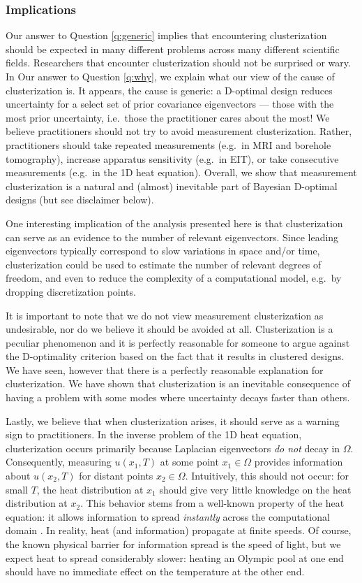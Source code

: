 \documentclass[ba]{imsart}
\theoremstyle{plain}
\theoremstyle{definition}
\theoremstyle{remark}
\begin{document}
\subsubsection{Implications}
Our answer to Question \ref{q:generic} implies that encountering
clusterization should be expected in many different problems across
many different scientific fields. Researchers that encounter
clusterization should not be surprised or wary. In Our answer to
Question \ref{q:why}, we explain what our view of the cause of
clusterization is. It appears, the cause is generic: a D-optimal
design reduces uncertainty for a select set of prior covariance
eigenvectors --- those with the most prior uncertainty, i.e.~those the
practitioner cares about the most! We believe practitioners should not
try to avoid measurement clusterization. Rather, practitioners should
take repeated measurements (e.g.~in MRI and borehole tomography),
increase apparatus sensitivity (e.g.~in EIT), or take consecutive
measurements (e.g.~in the 1D heat equation). Overall, we show that
measurement clusterization is a natural and (almost) inevitable part
of Bayesian D-optimal designs (but see disclaimer below).

One interesting implication of the analysis presented here is that
clusterization can serve as an evidence to the number of relevant
eigenvectors. Since leading eigenvectors typically correspond to slow
variations in space and/or time, clusterization could be used to
estimate the number of relevant degrees of freedom, and even to reduce
the complexity of a computational model, e.g.~by dropping
discretization points.

It is important to note that we do not view measurement clusterization
as undesirable, nor do we believe it should be avoided at
all. Clusterization is a peculiar phenomenon and it is perfectly
reasonable for someone to argue against the D-optimality criterion
based on the fact that it results in clustered designs. We have seen,
however that there is a perfectly reasonable explanation for
clusterization. We have shown that clusterization is an inevitable
consequence of having a problem with some modes where uncertainty
decays faster than others. 

Lastly, we believe that when clusterization arises, it should serve as
a warning sign to practitioners. In the inverse problem of the 1D heat
equation, clusterization occurs primarily because Laplacian
eigenvectors \emph{do not} decay in $\Omega$. Consequently, measuring
$u(x_1, T)$ at some point $x_1 \in \Omega$ provides information about
$u(x_2,T)$ for distant points $x_2 \in \Omega$. Intuitively, this
should not occur: for small $T$, the heat distribution at $x_1$ should
give very little knowledge on the heat distribution at $x_2$. This
behavior stems from a well-known property of the heat equation: it
allows information to spread \emph{instantly} across the computational
domain \cite{renardy2006PDE}. In reality, heat (and information)
propagate at finite speeds. Of course, the known physical barrier for
information spread is the speed of light, but we expect heat to spread
considerably slower: heating an Olympic pool at one end should have no
immediate effect on the temperature at the other end.
\end{document}
